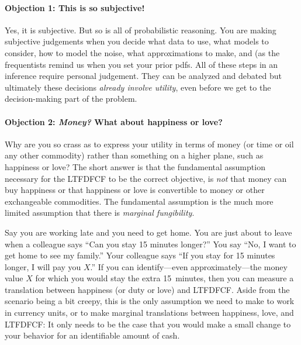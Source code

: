 \documentclass[12pt,twoside,pdftex]{article}
\begin{document}
\paragraph{Objection 1: This is so subjective!}
Yes, it is subjective.  But so is all of probabilistic reasoning.  You
are making subjective judgements when you decide what data to use,
what models to consider, how to model the noise, what approximations
to make, and (as the frequentists remind us when you set your prior pdfs.  All of these steps in an
inference require personal judgement.  They can be analyzed and
debated but ultimately these decisions \emph{already involve utility},
even before we get to the decision-making part of the problem.

\paragraph{Objection 2: \emph{Money?} What about happiness or love?}
Why are you so crass as to express your utility in terms of money (or
time or oil any other commodity) rather than something on a higher
plane, such as happiness or love?  The short answer is that the
fundamental assumption necessary for the LTFDFCF to be the correct
objective, is \emph{not} that money can buy happiness or that
happiness or love is convertible to money or other exchangeable
commodities.  The fundamental assumption is the much more limited
assumption that there is \emph{marginal fungibility}.

Say you are working late and you need to get home.  You are just about
to leave when a colleague says ``Can you stay 15 minutes longer?''
You say ``No, I want to get home to see my family.''  Your colleague
says ``If you stay for 15 minutes longer, I will pay you $X$.''  If
you can identify---even approximately---the money value $X$ for which
you would stay the extra 15~minutes, then you can measure a
translation between happiness (or duty or love) and LTFDFCF.  Aside
from the scenario being a bit creepy, this is the only assumption we
need to make to work in currency units, or to make marginal
translations between happiness, love, and LTFDFCF: It only needs to be
the case that you would make a small change to your behavior for an
identifiable amount of cash.
\end{document}
